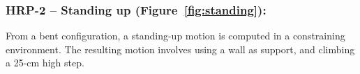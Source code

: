 
\subsubsection{HRP-2 -- Standing up (Figure~\ref{fig:standing}):}
From a bent configuration, a standing-up motion is computed in a constraining environment.
The resulting motion involves using a wall as support, and climbing a 25-cm high step.


